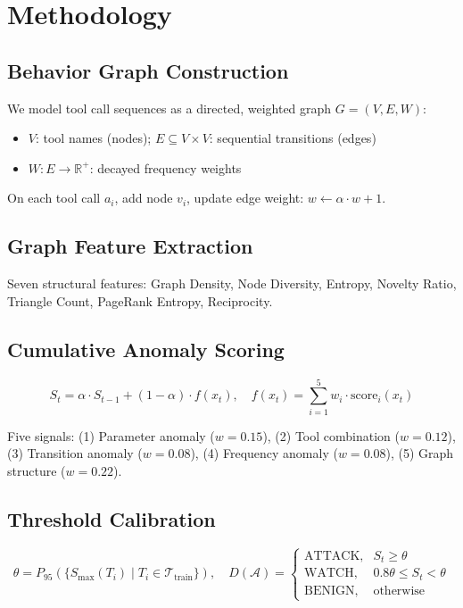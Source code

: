 \documentclass[conference]{IEEEtran}
\begin{document}
\section{Methodology}
\label{sec:method}

\subsection{Behavior Graph Construction}
We model tool call sequences as a directed, weighted graph $G = (V, E, W)$:
\begin{itemize}
    \item $V$: tool names (nodes); $E \subseteq V \times V$: sequential transitions (edges)
    \item $W: E \rightarrow \mathbb{R}^+$: decayed frequency weights
\end{itemize}
On each tool call $a_i$, add node $v_i$, update edge weight: $w \leftarrow \alpha \cdot w + 1$.

\subsection{Graph Feature Extraction}
Seven structural features: Graph Density, Node Diversity, Entropy, Novelty Ratio, Triangle Count, PageRank Entropy, Reciprocity.

\subsection{Cumulative Anomaly Scoring}
\[
S_t = \alpha \cdot S_{t-1} + (1-\alpha) \cdot f(x_t),\quad
f(x_t) = \sum_{i=1}^5 w_i \cdot \text{score}_i(x_t)
\]

Five signals: (1) Parameter anomaly ($w=0.15$), (2) Tool combination ($w=0.12$), (3) Transition anomaly ($w=0.08$), (4) Frequency anomaly ($w=0.08$), (5) Graph structure ($w=0.22$).

\subsection{Threshold Calibration}
\[
\theta = P_{95}(\{S_{\text{max}}(T_i) \mid T_i \in \mathcal{T}_{\text{train}}\}),\quad
D(\mathcal{A}) = \begin{cases}
\text{ATTACK}, & S_t \geq \theta \\
\text{WATCH}, & 0.8\theta \leq S_t < \theta \\
\text{BENIGN}, & \text{otherwise}
\end{cases}
\]
\end{document}
